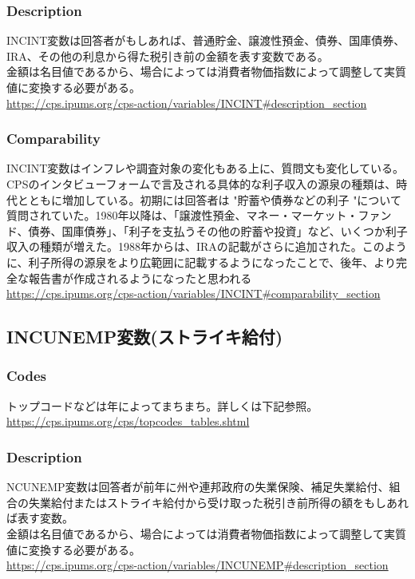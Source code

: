 \documentclass{jsarticle}
\begin{document}
\subsubsection{Description}
INCINT変数は回答者がもしあれば、普通貯金、譲渡性預金、債券、国庫債券、IRA、その他の利息から得た税引き前の金額を表す変数である。\\
  
金額は名目値であるから、場合によっては消費者物価指数によって調整して実質値に変換する必要がある。\\
\url{https://cps.ipums.org/cps-action/variables/INCINT#description_section}

\subsubsection{Comparability}
INCINT変数はインフレや調査対象の変化もある上に、質問文も変化している。CPSのインタビューフォームで言及される具体的な利子収入の源泉の種類は、時代とともに増加している。初期には回答者は "貯蓄や債券などの利子 "について質問されていた。1980年以降は、「譲渡性預金、マネー・マーケット・ファンド、債券、国庫債券」、「利子を支払うその他の貯蓄や投資」など、いくつか利子収入の種類が増えた。1988年からは、IRAの記載がさらに追加された。このように、利子所得の源泉をより広範囲に記載するようになったことで、後年、より完全な報告書が作成されるようになったと思われる\\
\url{https://cps.ipums.org/cps-action/variables/INCINT#comparability_section}

\subsection{INCUNEMP変数(ストライキ給付)}

\subsubsection{Codes}
トップコードなどは年によってまちまち。詳しくは下記参照。\\
\url{https://cps.ipums.org/cps/topcodes_tables.shtml}

\subsubsection{Description}
NCUNEMP変数は回答者が前年に州や連邦政府の失業保険、補足失業給付、組合の失業給付またはストライキ給付から受け取った税引き前所得の額をもしあれば表す変数。\\
  
金額は名目値であるから、場合によっては消費者物価指数によって調整して実質値に変換する必要がある。\\
\url{https://cps.ipums.org/cps-action/variables/INCUNEMP#description_section}
\end{document}
